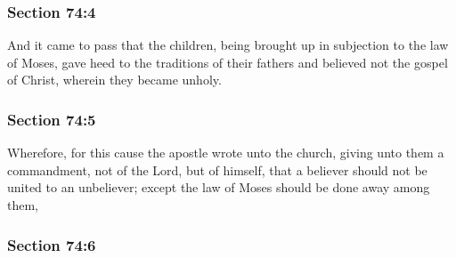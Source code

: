 
	\subsubsection{Section 74:4} %
		\label{DC74-4}

		And it came to pass that the children, being brought up in subjection to the law of Moses, gave heed to the traditions of their fathers and believed not the gospel of Christ, wherein they became unholy.


	\subsubsection{Section 74:5} %
		\label{DC74-5}

		Wherefore, for this cause the apostle wrote unto the church, giving unto them a commandment, not of the Lord, but of himself, that a believer should not be united to an unbeliever; except the law of Moses should be done away among them,


	\subsubsection{Section 74:6} %
		\label{DC74-6}

